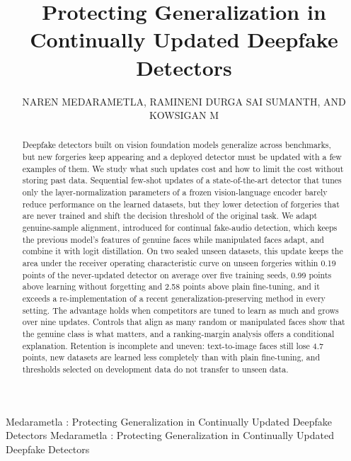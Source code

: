 \documentclass{ieeeaccess}
\begin{document}

\title{Protecting Generalization in Continually Updated Deepfake Detectors}
\author{\uppercase{Naren Medarametla}, \uppercase{Ramineni Durga Sai Sumanth}, AND \uppercase{Kowsigan M}}

\address[1]{School of Computer Science and Engineering, Vellore Institute of Technology, Chennai 600127, India (e-mail: naren.medarametla2023@vitstudent.ac.in; durga.sai2023@vitstudent.ac.in; kowsigan.m@vit.ac.in)}

\markboth
{Medarametla \headeretal: Protecting Generalization in Continually Updated Deepfake Detectors}
{Medarametla \headeretal: Protecting Generalization in Continually Updated Deepfake Detectors}


\begin{abstract}
Deepfake detectors built on vision foundation models generalize across benchmarks, but new forgeries keep appearing and a deployed detector must be updated with a few examples of them. We study what such updates cost and how to limit the cost without storing past data. Sequential few-shot updates of a state-of-the-art detector that tunes only the layer-normalization parameters of a frozen vision-language encoder barely reduce performance on the learned datasets, but they lower detection of forgeries that are never trained and shift the decision threshold of the original task. We adapt genuine-sample alignment, introduced for continual fake-audio detection, which keeps the previous model's features of genuine faces while manipulated faces adapt, and combine it with logit distillation. On two sealed unseen datasets, this update keeps the area under the receiver operating characteristic curve on unseen forgeries within 0.19 points of the never-updated detector on average over five training seeds, 0.99 points above learning without forgetting and 2.58 points above plain fine-tuning, and it exceeds a re-implementation of a recent generalization-preserving method in every setting. The advantage holds when competitors are tuned to learn as much and grows over nine updates. Controls that align as many random or manipulated faces show that the genuine class is what matters, and a ranking-margin analysis offers a conditional explanation. Retention is incomplete and uneven: text-to-image faces still lose 4.7 points, new datasets are learned less completely than with plain fine-tuning, and thresholds selected on development data do not transfer to unseen data.
\end{abstract}
\end{document}
